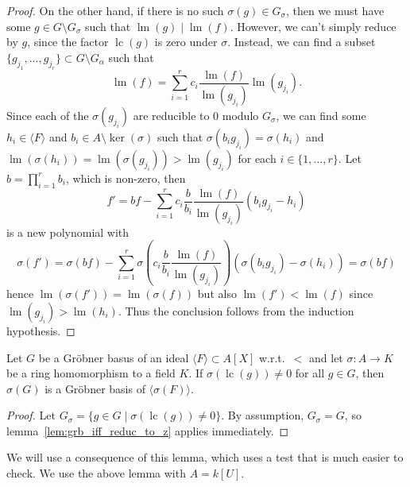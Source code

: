 \documentclass[a4paper, 12pt]{article}
\DeclareMathOperator{\LM}{lm}
\DeclareMathOperator{\LC}{lc}
\theoremstyle{changedot}
\theoremstyle{changedotbreak}
\theoremstyle{nonumberplain}
\newtheorem{proof}{Proof}
\begin{document}
\begin{proof}
  On the other hand, if there is no such $\sigma(g) \in G_{\sigma}$, then we must have some $g \in G \setminus G_{\sigma}$ such that $\LM(g) \mid \LM(f)$. However, we can't simply reduce by $g$, since the factor $\LC(g)$ is zero under $\sigma$. Instead, we can find a subset $\{g_{j_{1}}, \dots, g_{j_{r}}\} \subset G \setminus G_{\alpha}$ such that \[\LM(f) = \sum_{i = 1}^{r} c_{i} \frac{\LM(f)}{\LM(g_{j_{i}})} \LM(g_{j_{i}}).\]
  Since each of the $\sigma(g_{j_{i}})$ are reducible to 0 modulo $G_{\sigma}$, we can find some $h_{i} \in \langle F \rangle$ and $b_{i} \in A \setminus \ker(\sigma)$ such that $\sigma(b_{i} g_{j_{i}}) = \sigma(h_{i})$ and $\LM(\sigma(h_{i})) = \LM(\sigma(g_{j_{i}})) > \LM(g_{j_{i}})$ for each $i \in \{1, \dots, r\}$. Let $b = \prod_{i = 1}^{r} b_{i}$, which is non-zero, then
  \[f' = b f - \sum_{i = 1}^{r} c_{i} \frac{b}{b_{i}} \frac{\LM(f)}{\LM(g_{j_{i}})}(b_{i}g_{j_{i}} - h_{i})\]
  is a new polynomial with
  \[\sigma(f') = \sigma(b f) - \sum_{i = 1}^{r} \sigma\left(c_{i} \frac{b}{b_{i}} \frac{\LM(f)}{\LM(g_{j_{i}})}\right) (\sigma(b_{i} g_{j_{i}}) - \sigma(h_{i})) = \sigma(b f)\]
  hence $\LM(\sigma(f')) = \LM(\sigma(f))$ but also $\LM(f') < \LM(f)$ since $\LM(g_{j_{i}}) > \LM(h_{i})$. Thus the conclusion follows from the induction hypothesis.
\end{proof}

\begin{corollary}\label{cor:grb_if_nmap_to_z}
  Let $G$ be a Gröbner basus of an ideal $\langle F \rangle \subset A[X]$ w.r.t.\ $<$ and let $\sigma : A \to K$ be a ring homomorphism to a field $K$. If $\sigma(\LC(g)) \neq 0$ for all $g \in G$, then $\sigma(G)$ is a Gröbner basis of $\langle \sigma(F) \rangle$.
\end{corollary}
\begin{proof}
  Let $G_{\sigma} = \{g \in G \mid \sigma(\LC(g)) \neq 0\}$. By assumption, $G_{\sigma} = G$, so lemma~\ref{lem:grb_iff_reduc_to_z} applies immediately.
\end{proof}


We will use a consequence of this lemma, which uses a test that is much easier to check. We use the above lemma with $A = k[U]$.
\end{document}
